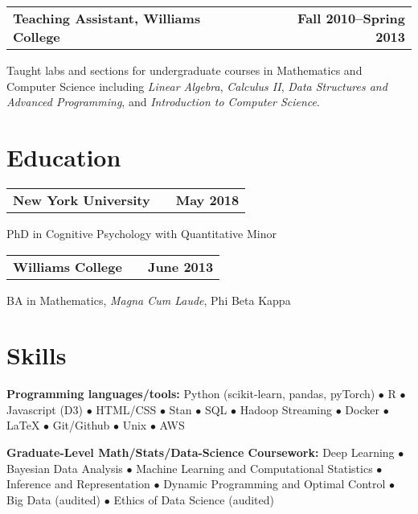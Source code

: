 \documentclass[10pt]{resume}
\begin{document}
\begin{addmargin}[1em]{0em}
\begin{tabular}{@{} L M R}
  \textbf{Teaching Assistant, Williams College}& &\textbf{Fall 2010--Spring 2013}\\
\end{tabular}\vspace{-1em}
  Taught labs and sections for undergraduate courses in Mathematics and Computer Science
  including \emph{Linear Algebra}, \emph{Calculus II}, \emph{Data Structures and Advanced
  Programming}, and \emph{Introduction to Computer Science}.

\end{addmargin}

\section{Education}

\hrulefill

\begin{addmargin}[1em]{0em}

\begin{tabular}{@{} L M R}
  \textbf{New York University}& &\textbf{May 2018}\\
\end{tabular}\vspace{-1em}
  PhD in Cognitive Psychology with Quantitative Minor

\begin{tabular}{@{} L M R}
  \textbf{Williams College}& &\textbf{June 2013}\\
\end{tabular}\vspace{-1em}
  BA in Mathematics, \emph{Magna Cum Laude}, Phi Beta Kappa

\end{addmargin}

\section{Skills}

\hrulefill

\begin{addmargin}[1em]{0em}
\textbf{Programming languages/tools:}
Python (scikit-learn, pandas, pyTorch) $\bullet$ R $\bullet$ Javascript (D3)
$\bullet$ HTML/CSS $\bullet$ Stan $\bullet$ SQL $\bullet$
Hadoop Streaming $\bullet$ Docker $\bullet$ LaTeX $\bullet$ Git/Github $\bullet$
Unix $\bullet$ AWS

\textbf{Graduate-Level Math/Stats/Data-Science Coursework:}
Deep Learning $\bullet$ Bayesian Data Analysis  $\bullet$ Machine Learning and Computational Statistics $\bullet$ 
Inference and Representation
$\bullet$ Dynamic Programming and Optimal Control $\bullet$
Big Data (audited) $\bullet$ Ethics of Data Science (audited)

\end{addmargin}
\end{document}
